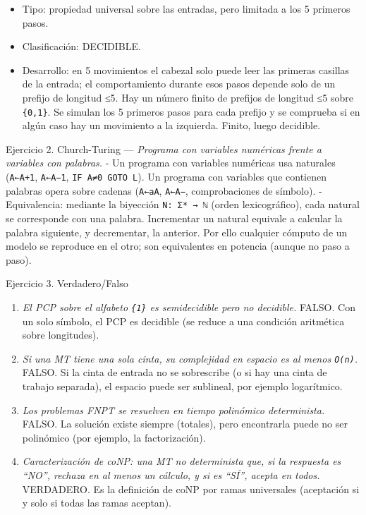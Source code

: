 \documentclass[12pt]{book} %
\providecommand{\tightlist}{%
  \setlength{\itemsep}{0pt}\setlength{\parskip}{0pt}}
\begin{document}
\begin{enumerate}
  \begin{itemize}
  \tightlist
  \item
    Tipo: propiedad universal sobre las entradas, pero limitada a los 5
    primeros pasos.
  \item
    Clasificación: DECIDIBLE.
  \item
    Desarrollo: en 5 movimientos el cabezal solo puede leer las primeras
    casillas de la entrada; el comportamiento durante esos pasos depende
    solo de un prefijo de longitud ≤5. Hay un número finito de prefijos
    de longitud ≤5 sobre \texttt{\{0,1\}}. Se simulan los 5 primeros
    pasos para cada prefijo y se comprueba si en algún caso hay un
    movimiento a la izquierda. Finito, luego decidible.
  \end{itemize}
\end{enumerate}

Ejercicio 2. Church-Turing --- \emph{Programa con variables numéricas
frente a variables con palabras.} - Un programa con variables numéricas
usa naturales (\texttt{A←A+1}, \texttt{A←A−1},
\texttt{IF\ A≠0\ GOTO\ L}). Un programa con variables que contienen
palabras opera sobre cadenas (\texttt{A←aA}, \texttt{A←A−},
comprobaciones de símbolo). - Equivalencia: mediante la biyección
\texttt{N:\ Σ*\ →\ ℕ} (orden lexicográfico), cada natural se corresponde
con una palabra. Incrementar un natural equivale a calcular la palabra
siguiente, y decrementar, la anterior. Por ello cualquier cómputo de un
modelo se reproduce en el otro; son equivalentes en potencia (aunque no
paso a paso).

Ejercicio 3. Verdadero/Falso

\begin{enumerate}
\def\labelenumi{\arabic{enumi}.}
\tightlist
\item
  \emph{El PCP sobre el alfabeto \texttt{\{1\}} es semidecidible pero no
  decidible.} FALSO. Con un solo símbolo, el PCP es decidible (se reduce
  a una condición aritmética sobre longitudes).
\item
  \emph{Si una MT tiene una sola cinta, su complejidad en espacio es al
  menos \texttt{O(n)}.} FALSO. Si la cinta de entrada no se sobrescribe
  (o si hay una cinta de trabajo separada), el espacio puede ser
  sublineal, por ejemplo logarítmico.
\item
  \emph{Los problemas FNPT se resuelven en tiempo polinómico
  determinista.} FALSO. La solución existe siempre (totales), pero
  encontrarla puede no ser polinómico (por ejemplo, la factorización).
\item
  \emph{Caracterización de coNP: una MT no determinista que, si la
  respuesta es ``NO'', rechaza en al menos un cálculo, y si es ``SÍ'',
  acepta en todos.} VERDADERO. Es la definición de coNP por ramas
  universales (aceptación si y solo si todas las ramas aceptan).
\end{enumerate}
\end{document}

